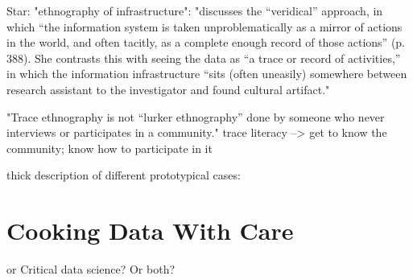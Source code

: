 Star: "ethnography of infrastructure":
"discusses the “veridical” approach, in which “the information system
is taken unproblematically as a mirror of actions in the world, and often tacitly, as a complete
enough record of those actions” (p. 388).
She contrasts this with seeing the data as “a trace or record
of activities,” in which the information infrastructure “sits (often uneasily) somewhere between
research assistant to the investigator and found cultural artifact."

"Trace
ethnography is not “lurker ethnography” done by someone who never interviews or participates in
a community."
trace literacy --> get to know the community; know how to participate in it

thick description of different prototypical cases:

\section{Cooking Data With Care}
or Critical data science? Or both?
